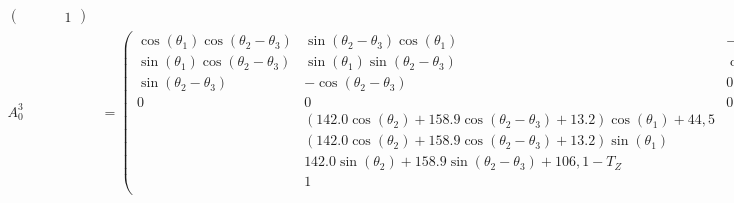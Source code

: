 \documentclass[a4paper,12pt]{article}
\begin{document}
{\begin{align*}
\begin{pmatrix}
                                                                                   & \qquad 1
    \end{pmatrix} \\
    A_0^3 & =
    \begin{pmatrix}
        \cos{\left(\theta_{1} \right)} \cos{\left(\theta_{2} - \theta_{3} \right)} & \sin{\left(\theta_{2} - \theta_{3} \right)} \cos{\left(\theta_{1} \right)}                                                                         & - \sin{\left(\theta_{1} \right)} \\
        \sin{\left(\theta_{1} \right)} \cos{\left(\theta_{2} - \theta_{3} \right)} & \sin{\left(\theta_{1} \right)} \sin{\left(\theta_{2} - \theta_{3} \right)}                                                                         & \cos{\left(\theta_{1} \right)}   \\
        \sin{\left(\theta_{2} - \theta_{3} \right)}                                & - \cos{\left(\theta_{2} - \theta_{3} \right)}                                                                                                      & 0                                \\
        0                                                                          & 0                                                                                                                                                  & 0                                \\
                                                                                   & \left(142.0 \cos{\left(\theta_{2} \right)} + 158.9 \cos{\left(\theta_{2} - \theta_{3} \right)} + 13.2\right) \cos{\left(\theta_{1} \right)} + 44,5                                    \\
                                                                                   & \left(142.0 \cos{\left(\theta_{2} \right)} + 158.9 \cos{\left(\theta_{2} - \theta_{3} \right)} + 13.2\right) \sin{\left(\theta_{1} \right)}                                           \\
                                                                                   & 142.0 \sin{\left(\theta_{2} \right)} + 158.9 \sin{\left(\theta_{2} - \theta_{3} \right)} + 106,1 - T_Z                                                                                \\
                                                                                   & 1                                                                                                                                                                                     \\
    \end{pmatrix}
\end{align*}}
\end{document}
